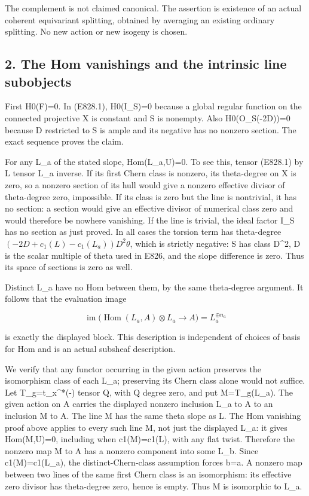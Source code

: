 The complement is not claimed canonical. The assertion is existence of an
actual coherent equivariant splitting, obtained by averaging an existing
ordinary splitting. No new action or new isogeny is chosen.

\subsection{2. The Hom vanishings and the intrinsic line
subobjects}\label{SF-E828:the-hom-vanishings-and-the-intrinsic-line-subobjects}

First H0(F)=0. In (E828.1), H0(I\_S)=0 because a global regular function on
the connected projective X is constant and S is nonempty. Also
H0(O\_S(-2D))=0 because D restricted to S is ample and its negative has no
nonzero section. The exact sequence proves the claim.

For any L\_a of the stated slope, Hom(L\_a,U)=0. To see this, tensor
(E828.1) by L tensor L\_a inverse. If its first Chern class is nonzero, its
theta-degree on X is zero, so a nonzero section of its hull would give a
nonzero effective divisor of theta-degree zero, impossible. If its class is
zero but the line is nontrivial, it has no section: a section would give an
effective divisor of numerical class zero and would therefore be nowhere
vanishing. If the line is trivial, the ideal factor I\_S has no section as
just proved. In all cases the torsion term has theta-degree
\((-2D+c_1(L)-c_1(L_a))D^2\theta\), which is strictly negative: S has class
D\^{}2, D is the scalar multiple of theta used in E826, and the slope
difference is zero. Thus its space of sections is zero as well.

Distinct L\_a have no Hom between them, by the same theta-degree argument.
It follows that the evaluation image

\[
 \operatorname{im}\bigl(\operatorname{Hom}(L_a,A)\otimes L_a\to A\bigr)
        =L_a^{\oplus n_a}
 \tag{E828.3}
\]

is exactly the displayed block. This description is independent of choices
of basis for Hom and is an actual subsheaf description.

We verify that any functor occurring in the given action preserves the
isomorphism class of each L\_a; preserving its Chern class alone would not
suffice. Let T\_g=t\_x\^{}*(-) tensor Q, with Q degree zero, and put
M=T\_g(L\_a). The given action on A carries the displayed nonzero inclusion
L\_a to A to an inclusion M to A. The line M has the same theta slope as L.
The Hom vanishing proof above applies to every such line M, not just the
displayed L\_a: it gives Hom(M,U)=0, including when c1(M)=c1(L), with any
flat twist. Therefore the nonzero map M to A has a nonzero component into
some L\_b. Since c1(M)=c1(L\_a), the distinct-Chern-class assumption forces
b=a. A nonzero map between two lines of the same first Chern class is an
isomorphism: its effective zero divisor has theta-degree zero, hence is
empty. Thus M is isomorphic to L\_a.

